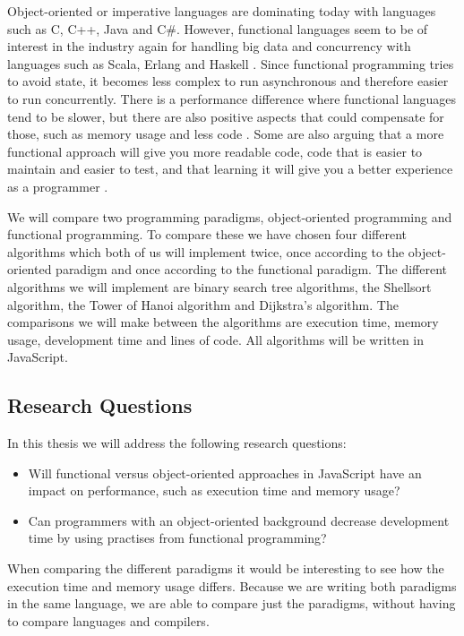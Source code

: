 \documentclass {article}
\begin{document}
Object-oriented or imperative languages are dominating today with languages such as C, C++, Java and C\#. However, functional languages seem to be of interest in the industry again for handling big data and concurrency with languages such as Scala, Erlang and Haskell \cite{drboolean, eriksen, erikarl}. Since functional programming tries to avoid state, it becomes less complex to run asynchronous and therefore easier to run concurrently. There is a performance difference where functional languages tend to be slower, but there are also positive aspects that could compensate for those, such as memory usage and less code \cite{fogus, alomgi}.  Some are also arguing that a more functional approach will give you more readable code, code that is easier to maintain and easier to test, and that learning it will give you a better experience as a programmer \cite{drboolean, meijer}. 

We will compare two programming paradigms, object-oriented programming and functional programming. To compare these we have chosen four different algorithms which both of us will implement twice, once according to the object-oriented paradigm and once according to the functional paradigm. The different algorithms we will implement are binary search tree algorithms, the Shellsort algorithm, the Tower of Hanoi algorithm and Dijkstra's algorithm. The comparisons we will make between the algorithms are execution time, memory usage, development time and lines of code. All algorithms will be written in JavaScript.
\subsection{Research Questions}
In this thesis we will address the following research questions:
\begin{itemize}
\item Will functional versus object-oriented approaches in JavaScript have an impact on performance, such as execution time and memory usage?
\item Can programmers with an object-oriented background decrease development time by using practises from functional programming?
\end{itemize}

When comparing the different paradigms it would be interesting to see how the execution time and memory usage differs. Because we are writing both paradigms in the same language, we are able to compare just the paradigms, without having to compare languages and compilers.
\end{document}
